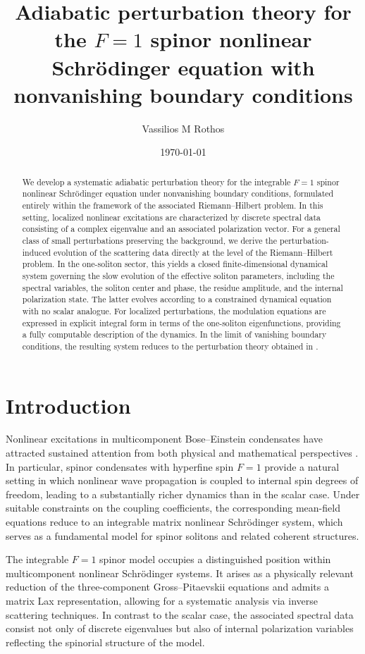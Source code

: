 \documentclass[11pt]{amsart}
\title[Spinor NLS with NZBC]{Adiabatic perturbation theory for the $F=1$ spinor nonlinear Schr\"odinger equation with nonvanishing boundary conditions}
\author{Vassilios M Rothos}
\date{\today}
\theoremstyle{definition}
\numberwithin{equation}{section}
\begin{document}
\begin{abstract}
We develop a systematic adiabatic perturbation theory for the integrable $F=1$ spinor nonlinear Schr\"odinger equation under nonvanishing boundary conditions, formulated entirely within the framework of the associated Riemann--Hilbert problem. In this setting, localized nonlinear excitations are characterized by discrete spectral data consisting of a complex eigenvalue and an associated polarization vector. For a general class of small perturbations preserving the background, we derive the perturbation-induced evolution of the scattering data directly at the level of the Riemann--Hilbert problem. In the one-soliton sector, this yields a closed finite-dimensional dynamical system governing the slow evolution of the effective soliton parameters, including the spectral variables, the soliton center and phase, the residue amplitude, and the internal polarization state. The latter evolves according to a constrained dynamical equation with no scalar analogue. For localized perturbations, the modulation equations are expressed in explicit integral form in terms of the one-soliton eigenfunctions, providing a fully computable description of the dynamics. In the limit of vanishing boundary conditions, the resulting system reduces to the perturbation theory obtained in \cite{Doktorov2008}.
\end{abstract}

\maketitle
\section{Introduction}
\label{NVBC_spinor1}

Nonlinear excitations in multicomponent Bose--Einstein condensates have attracted sustained attention from both physical and mathematical perspectives \cite{AblowitzClarkson1992,SulemSulem1999}. In particular, spinor condensates with hyperfine spin $F=1$ provide a natural setting in which nonlinear wave propagation is coupled to internal spin degrees of freedom, leading to a substantially richer dynamics than in the scalar case. Under suitable constraints on the coupling coefficients, the corresponding mean-field equations reduce to an integrable matrix nonlinear Schr\"odinger system, which serves as a fundamental model for spinor solitons and related coherent structures.

The integrable $F=1$ spinor model occupies a distinguished position within multicomponent nonlinear Schr\"odinger systems. It arises as a physically relevant reduction of the three-component Gross--Pitaevskii equations and admits a matrix Lax representation, allowing for a systematic analysis via inverse scattering techniques. In contrast to the scalar case, the associated spectral data consist not only of discrete eigenvalues but also of internal polarization variables reflecting the spinorial structure of the model.
\end{document}
